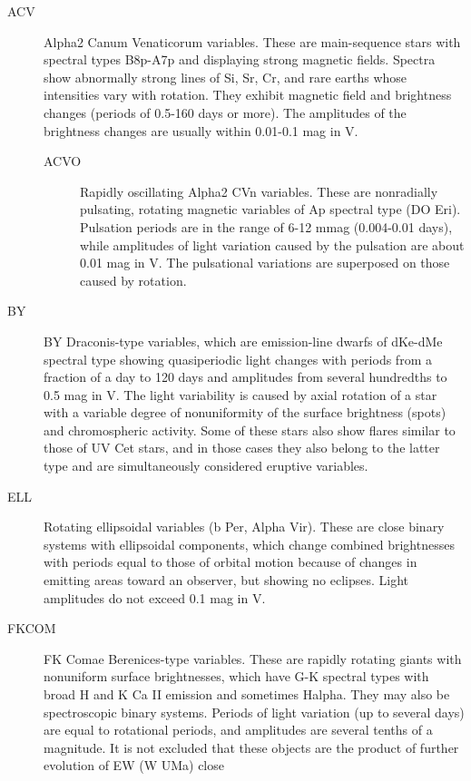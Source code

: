 \begin{description}
\item[ACV]		Alpha2 Canum Venaticorum variables. These are
				main-sequence stars with spectral types B8p-A7p and displaying strong
				magnetic fields. Spectra show abnormally strong lines of Si, Sr, Cr, and
				rare earths whose intensities vary with rotation. They exhibit magnetic
				field and brightness changes (periods of 0.5-160 days or more). The
				amplitudes of the brightness changes are usually within 0.01-0.1 mag in V.
	\begin{description}
\item[ACVO]		Rapidly oscillating Alpha2 CVn variables. These are
				nonradially pulsating, rotating magnetic variables of Ap spectral type
				(DO Eri). Pulsation periods are in the range of 6-12 mmag (0.004-0.01
				days), while amplitudes of light variation caused by the pulsation are
				about 0.01 mag in V. The pulsational variations are superposed on those
				caused by rotation.
	\end{description}
\item[BY]		BY Draconis-type variables, which are emission-line dwarfs
				of dKe-dMe spectral type showing quasiperiodic light changes with
				periods from a fraction of a day to 120 days and amplitudes from several
				hundredths to 0.5 mag in V. The light variability is caused by axial
				rotation of a star with a variable degree of nonuniformity of the
				surface brightness (spots) and chromospheric activity. Some of these
				stars also show flares similar to those of UV Cet stars, and in those
				cases they also belong to the latter type and are simultaneously
				considered eruptive variables.
\item[ELL]		Rotating ellipsoidal variables (b Per, Alpha Vir). These
				are close binary systems with ellipsoidal components, which change
				combined brightnesses with periods equal to those of orbital motion
				because of changes in emitting areas toward an observer, but showing no
				eclipses. Light amplitudes do not exceed 0.1 mag in V.
\item[FKCOM] 	FK Comae Berenices-type variables. These are rapidly
				rotating giants with nonuniform surface brightnesses, which have G-K
				spectral types with broad H and K Ca II emission and sometimes Halpha.
				They may also be spectroscopic binary systems. Periods of light
				variation (up to several days) are equal to rotational periods, and
				amplitudes are several tenths of a magnitude. It is not excluded that
				these objects are the product of further evolution of EW (W UMa) close

\end{description}
